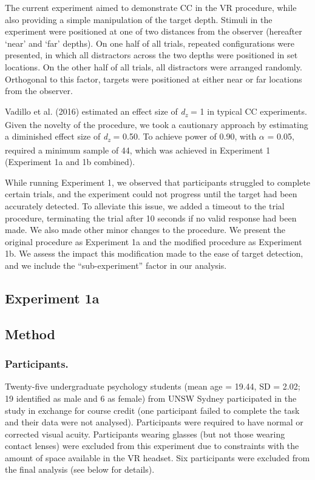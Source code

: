 \documentclass[
  english,
  man,floatsintext]{apa7}
\begin{document}
The current experiment aimed to demonstrate CC in the VR procedure, while also providing a simple manipulation of the target depth. Stimuli in the experiment were positioned at one of two distances from the observer (hereafter `near' and `far' depths). On one half of all trials, repeated configurations were presented, in which all distractors across the two depths were positioned in set locations. On the other half of all trials, all distractors were arranged randomly. Orthogonal to this factor, targets were positioned at either near or far locations from the observer.

Vadillo et al. (2016) estimated an effect size of \emph{d\textsubscript{z}} = 1 in typical CC experiments. Given the novelty of the procedure, we took a cautionary approach by estimating a diminished effect size of \emph{d\textsubscript{z}} = 0.50. To achieve power of 0.90, with \(\alpha\) = 0.05, required a minimum sample of 44, which was achieved in Experiment 1 (Experiment 1a and 1b combined).

While running Experiment 1, we observed that participants struggled to complete certain trials, and the experiment could not progress until the target had been accurately detected. To alleviate this issue, we added a timeout to the trial procedure, terminating the trial after 10 seconds if no valid response had been made. We also made other minor changes to the procedure. We present the original procedure as Experiment 1a and the modified procedure as Experiment 1b. We assess the impact this modification made to the ease of target detection, and we include the ``sub-experiment'' factor in our analysis.

\hypertarget{experiment-1a}{%
\subsection{Experiment 1a}\label{experiment-1a}}

\hypertarget{method}{%
\subsection{Method}\label{method}}

\hypertarget{participants.}{%
\subsubsection{Participants.}\label{participants.}}

Twenty-five undergraduate psychology students (mean age = 19.44, SD = 2.02; 19 identified as male and 6 as female) from UNSW Sydney participated in the study in exchange for course credit (one participant failed to complete the task and their data were not analysed). Participants were required to have normal or corrected visual acuity. Participants wearing glasses (but not those wearing contact lenses) were excluded from this experiment due to constraints with the amount of space available in the VR headset. Six participants were excluded from the final analysis (see below for details).
\end{document}
